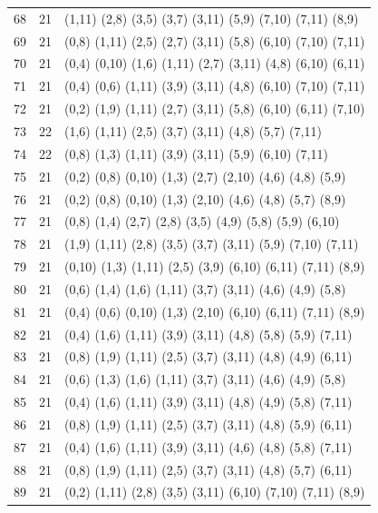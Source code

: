 \begin{appendix}
{\begin{longtable}{lll}
68 & 21 & (1,11)  (2,8)  (3,5)  (3,7)   (3,11)  (5,9)   (7,10)  (7,11)  (8,9)\\
69 & 21 & (0,8)   (1,11) (2,5)  (2,7)   (3,11)  (5,8)   (6,10)  (7,10)  (7,11)\\
70 & 21 & (0,4)   (0,10) (1,6)  (1,11)  (2,7)   (3,11)  (4,8)   (6,10)  (6,11)\\
71 & 21 & (0,4)   (0,6)  (1,11) (3,9)   (3,11)  (4,8)   (6,10)  (7,10)  (7,11)\\
72 & 21 & (0,2)   (1,9)  (1,11) (2,7)   (3,11)  (5,8)   (6,10)  (6,11)  (7,10)\\
73 & 22 & (1,6)   (1,11) (2,5)  (3,7)   (3,11)  (4,8)   (5,7)   (7,11)  \\
74 & 22 & (0,8)   (1,3)  (1,11) (3,9)   (3,11)  (5,9)   (6,10)  (7,11)  \\
75 & 21 & (0,2)   (0,8)  (0,10) (1,3)   (2,7)   (2,10)  (4,6)   (4,8)   (5,9)\\
76 & 21 & (0,2)   (0,8)  (0,10) (1,3)   (2,10)  (4,6)   (4,8)   (5,7)   (8,9)\\
77 & 21 & (0,8)   (1,4)  (2,7)  (2,8)   (3,5)   (4,9)   (5,8)   (5,9)   (6,10)\\
78 & 21 & (1,9)   (1,11) (2,8)  (3,5)   (3,7)   (3,11)  (5,9)   (7,10)  (7,11)\\
79 & 21 & (0,10)  (1,3)  (1,11) (2,5)   (3,9)   (6,10)  (6,11)  (7,11)  (8,9)\\
80 & 21 & (0,6)   (1,4)  (1,6)  (1,11)  (3,7)   (3,11)  (4,6)   (4,9)   (5,8)\\
81 & 21 & (0,4)   (0,6)  (0,10) (1,3)   (2,10)  (6,10)  (6,11)  (7,11)  (8,9)\\
82 & 21 & (0,4)   (1,6)  (1,11) (3,9)   (3,11)  (4,8)   (5,8)   (5,9)   (7,11)\\
83 & 21 & (0,8)   (1,9)  (1,11) (2,5)   (3,7)   (3,11)  (4,8)   (4,9)   (6,11)\\
84 & 21 & (0,6)   (1,3)  (1,6)  (1,11)  (3,7)   (3,11)  (4,6)   (4,9)   (5,8)\\
85 & 21 & (0,4)   (1,6)  (1,11) (3,9)   (3,11)  (4,8)   (4,9)   (5,8)   (7,11)\\
86 & 21 & (0,8)   (1,9)  (1,11) (2,5)   (3,7)   (3,11)  (4,8)   (5,9)   (6,11)\\
87 & 21 & (0,4)   (1,6)  (1,11) (3,9)   (3,11)  (4,6)   (4,8)   (5,8)   (7,11)\\
88 & 21 & (0,8)   (1,9)  (1,11) (2,5)   (3,7)   (3,11)  (4,8)   (5,7)   (6,11)\\
89 & 21 & (0,2)   (1,11) (2,8)  (3,5)   (3,11)  (6,10)  (7,10)  (7,11)  (8,9)\\

\end{longtable}}
\end{appendix}
